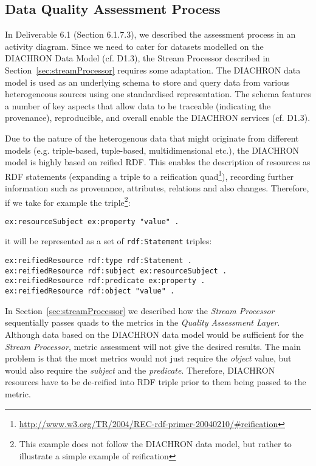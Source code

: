 
\subsection{Data Quality Assessment Process}
\label{sec:DQAssessment} 
In Deliverable 6.1 (Section 6.1.7.3), we described the assessment process in an activity diagram.
Since we need to cater for datasets modelled on the DIACHRON Data Model (cf. D1.3), the Stream Processor described in Section~\ref{sec:streamProcessor} requires some adaptation.
The DIACHRON data model is used as an underlying schema to store and query data from various heterogeneous sources using one standardised representation.
The schema features a number of key aspects that allow data to be traceable (indicating the provenance), reproducible, and overall enable the DIACHRON services (cf. D1.3).

Due to the nature of the heterogenous data that might originate from different models (e.g. triple-based, tuple-based, multidimensional etc.), the DIACHRON model is highly based on reified RDF.
This enables the description of resources as RDF statements (expanding a triple to a reification quad\footnote{\url{http://www.w3.org/TR/2004/REC-rdf-primer-20040210/#reification}}), recording further information such as provenance, attributes, relations and also changes.
Therefore, if we take for example the triple\footnote{This example does not follow the DIACHRON data model, but rather to illustrate a simple example of reification}:
\begin{lstlisting}[language=N3]
ex:resourceSubject ex:property "value" .
\end{lstlisting}
it will be represented as a set of \texttt{rdf:Statement} triples:
\begin{lstlisting}[language=N3]
ex:reifiedResource rdf:type rdf:Statement .
ex:reifiedResource rdf:subject ex:resourceSubject .
ex:reifiedResource rdf:predicate ex:property .
ex:reifiedResource rdf:object "value" .
\end{lstlisting}

In Section~\ref{sec:streamProcessor} we described how the \emph{Stream Processor} sequentially passes quads to the metrics in the \emph{Quality Assessment Layer}.
Although data based on the DIACHRON data model would be sufficient for the \emph{Stream Processor}, metric assessment will not give the desired results.
The main problem is that the most metrics would not just require the \emph{object} value, but would also require the \emph{subject} and the \emph{predicate}.
Therefore, DIACHRON resources have to be de-reified into RDF triple prior to them being passed to the metric.

